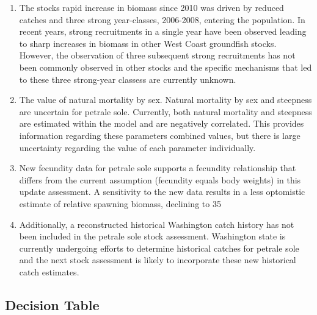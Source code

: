 \documentclass[12pt,]{article}
\begin{document}
\begin{enumerate}

\item The stocks rapid increase in biomass since 2010 was driven by reduced catches and three strong year-classes, 2006-2008, entering the population.  In recent years, strong recruitments in a single year have been observed leading to sharp increases in biomass in other West Coast groundfish stocks. However, the observation of three subsequent strong recruitments has not been commonly observed in other stocks and the specific mechanisms that led to these three strong-year classess are currently unknown. 

\item The value of natural mortality by sex.    Natural mortality by sex and steepness are uncertain for petrale sole.  Currently, both natural mortality and steepness are estimated within the model and are negatively correlated.  This provides information regarding these parameters combined values, but there is large uncertainty regarding the value of each parameter individually.

\item New fecundity data for petrale sole supports a fecundity relationship that differs from the current assumption (fecundity equals body weights) in this update assessment. A sensitivity to the new data results in a less optomistic estimate of relative spawning biomass, declining to 35%

\item Additionally, a reconstructed historical Washington catch history has not been included in the petrale sole stock assessment.  Washington state is currently undergoing efforts to determine historical catches for petrale sole and the next stock assessment is likely to incorporate these new historical catch estimates. 

\end{enumerate}

\subsection*{Decision Table}\label{decision-table}
\end{document}
